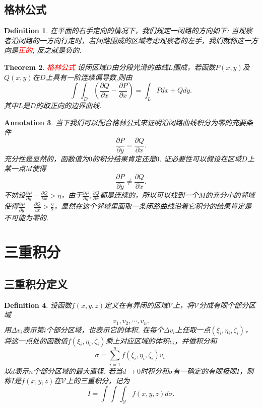 \documentclass{article}
\newtheorem{theorem}{Theorem}[section]
\newtheorem{definition}[theorem]{Definition}
\newtheorem{annotation}[theorem]{Annotation}
\newcommand{\redt}[1]{\textcolor{red}{#1}}
\begin{document}
\subsection{格林公式}

\begin{definition}
\rm 在平面的右手定向的情况下，我们规定一闭路的方向如下: 当观察者沿闭路的一方向行走时，若闭路围成的区域考虑观察者的左手，我们就称这一方向是\redt{正的}; 反之就是负的. 
\end{definition}

\begin{theorem}
\rm \redt{格林公式} 设闭区域$D$由分段光滑的曲线$L$围成，若函数$P(x,y)$及$Q(x,y)$在$D$上具有一阶连续偏导数,则由
$$
\int\int_D \left( \frac{\partial Q}{\partial x} - \frac{\partial P}{\partial x} \right) = \int_L Pdx+Qdy.
$$
其中$L$是$D$的取正向的边界曲线. 
\end{theorem}

\begin{annotation}
\rm 当下我们可以配合格林公式来证明沿闭路曲线积分为零的充要条件
$$
\frac{\partial P}{\partial y} = \frac{\partial Q}{\partial x}.
$$
充分性是显然的，函数值为$0$的积分结果肯定还是$0$. 证必要性可以假设在区域$D$上某一点$M$使得
$$
\frac{\partial P}{\partial y} \neq \frac{\partial Q}{\partial x}.
$$
不妨设$\frac{\partial P}{\partial y} - \frac{\partial Q}{\partial x} > \eta$，由于$\frac{\partial P}{\partial y} ,\frac{\partial Q}{\partial x}$都是连续的，所以可以找到一个$M$的充分小的邻域使得$\frac{\partial P}{\partial y} - \frac{\partial Q}{\partial x} > \frac{\eta}{2}$，显然在这个邻域里面取一条闭路曲线沿着它积分的结果肯定是不可能为零的. 
\end{annotation}

\newpage
\section{三重积分}

\subsection{三重积分定义}
\begin{definition}
\rm 设函数$f(x,y,z)$定义在有界闭的区域$\mathcal{V}$上，将$\mathcal{V}$分成有限个部分区域
$$
v_1,v_2,\cdots,v_n.
$$
用$\Delta v_i$表示第$i$个部分区域，也表示它的体积. 在每个$\Delta v_i$上任取一点$(\xi_i,\eta_i,\zeta_i)$，将这一点处的函数值$f(\xi_i,\eta_i,\zeta_i)$乘上对应区域的体积$v_i$，并做积分和
$$
\sigma = \sum\limits_{i = 1}^nf(\xi_i,\eta_i,\zeta_i)v_i.
$$
以$d$表示$n$个部分区域的最大直径. 若当$d \to 0$时积分和$\sigma$有一确定的有限极限$I$，则称$I$是$f(x,y,z)$在$\mathcal{V}$上的三重积分，记为
$$
I = \int\int\int_{\mathcal{V}} f(x,y,z)d\sigma.
$$
\end{definition}
\end{document}
